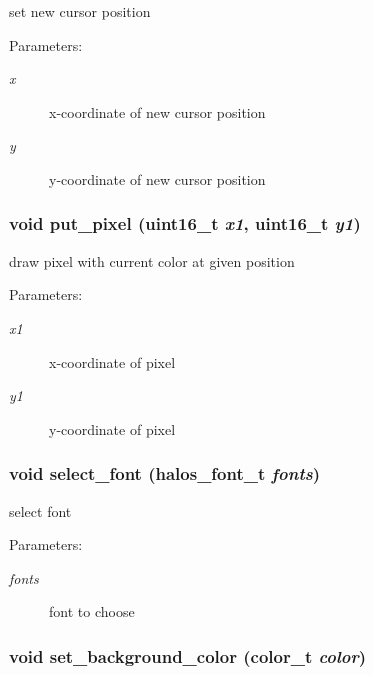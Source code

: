 set new cursor position 

\begin{Desc}
\item[Parameters:]
\begin{description}
\item[{\em x}]x-coordinate of new cursor position \item[{\em y}]y-coordinate of new cursor position \end{description}
\end{Desc}
\hypertarget{group__hgdi__api_ga56b1c619a3b3c381b9cc7ad9e66fb77}{
\subsubsection[{put\_\-pixel}]{\setlength{\rightskip}{0pt plus 5cm}void put\_\-pixel (uint16\_\-t {\em x1}, \/  uint16\_\-t {\em y1})}}
\label{group__hgdi__api_ga56b1c619a3b3c381b9cc7ad9e66fb77}


draw pixel with current color at given position 

\begin{Desc}
\item[Parameters:]
\begin{description}
\item[{\em x1}]x-coordinate of pixel \item[{\em y1}]y-coordinate of pixel \end{description}
\end{Desc}
\hypertarget{group__hgdi__api_g325aa117e69b5614f75198308d116b69}{
\subsubsection[{select\_\-font}]{\setlength{\rightskip}{0pt plus 5cm}void select\_\-font ({\bf halos\_\-font\_\-t} {\em fonts})}}
\label{group__hgdi__api_g325aa117e69b5614f75198308d116b69}


select font 

\begin{Desc}
\item[Parameters:]
\begin{description}
\item[{\em fonts}]font to choose \end{description}
\end{Desc}
\hypertarget{group__hgdi__api_g4215543853fd0158a34117310a5f5efb}{
\subsubsection[{set\_\-background\_\-color}]{\setlength{\rightskip}{0pt plus 5cm}void set\_\-background\_\-color ({\bf color\_\-t} {\em color})}}
\label{group__hgdi__api_g4215543853fd0158a34117310a5f5efb}


